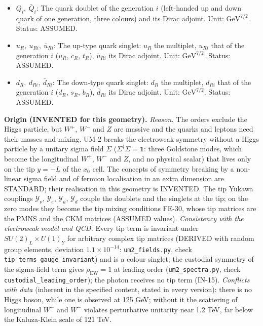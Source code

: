 \documentclass[
  10pt,
]{article}
\begin{document}
\begin{itemize}
  \(\mu_R\), \(\tau_R\)). Unit: \(\mathrm{GeV}^{7/2}\). Status: ASSUMED.
\item
  \(Q_i,\ \bar Q_i\): The quark doublet of the generation \(i\)
  (left-handed up and down quark of one generation, three colours) and
  its Dirac adjoint. Unit: \(\mathrm{GeV}^{7/2}\). Status: ASSUMED.
\item
  \(u_R,\ u_{Ri},\ \bar u_{Ri}\): The up-type quark singlet: \(u_R\) the
  multiplet, \(u_{Ri}\) that of the generation \(i\) (\(u_R\), \(c_R\),
  \(t_R\)), \(\bar u_{Ri}\) its Dirac adjoint. Unit:
  \(\mathrm{GeV}^{7/2}\). Status: ASSUMED.
\item
  \(d_R,\ d_{Ri},\ \bar d_{Ri}\): The down-type quark singlet: \(d_R\)
  the multiplet, \(d_{Ri}\) that of the generation \(i\) (\(d_R\),
  \(s_R\), \(b_R\)), \(\bar d_{Ri}\) its Dirac adjoint. Unit:
  \(\mathrm{GeV}^{7/2}\). Status: ASSUMED.
\end{itemize}

\textbf{Origin (INVENTED for this geometry).} \emph{Reason.} The orders
exclude the Higgs particle, but \(W^+\), \(W^-\) and \(Z\) are massive
and the quarks and leptons need their masses and mixing. UM-2 breaks the
electroweak symmetry without a Higgs particle by a unitary sigma field
\(\Sigma\) (\(\Sigma^\dagger\Sigma = \mathbf{1}\): three Goldstone
modes, which become the longitudinal \(W^+\), \(W^-\) and \(Z\), and no
physical scalar) that lives only on the tip \(y = -L\) of the \(x_0\)
cell. The concepts of symmetry breaking by a non-linear sigma field and
of fermion localisation in an extra dimension are STANDARD; their
realisation in this geometry is INVENTED. The tip Yukawa couplings
\(\mathcal{Y}_\nu\), \(\mathcal{Y}_e\), \(\mathcal{Y}_u\),
\(\mathcal{Y}_d\) couple the doublets and the singlets at the tip; on
the zero modes they become the tip mixing conditions FE-30, whose tip
matrices are the PMNS and the CKM matrices (ASSUMED values).
\emph{Consistency with the electroweak model and QCD.} Every tip term is
invariant under \(SU(2)_L\times U(1)_Y\) for arbitrary complex tip
matrices (DERIVED with random group elements, deviation
\(1.1\times10^{-14}\): \texttt{um2\_fields.py}, check
\texttt{tip\_terms\_gauge\_invariant}) and is a colour singlet; the
custodial symmetry of the sigma-field term gives
\(\rho_{\mathrm{EW}} = 1\) at leading order (\texttt{um2\_spectra.py},
check \texttt{custodial\_leading\_order}); the photon receives no tip
term (IN-15). \emph{Conflicts with data} (inherent in the specified
content, stated in every version): there is no Higgs boson, while one is
observed at 125 GeV; without it the scattering of longitudinal \(W^+\)
and \(W^-\) violates perturbative unitarity near 1.2 TeV, far below the
Kaluza-Klein scale of 121 TeV.
\end{document}
